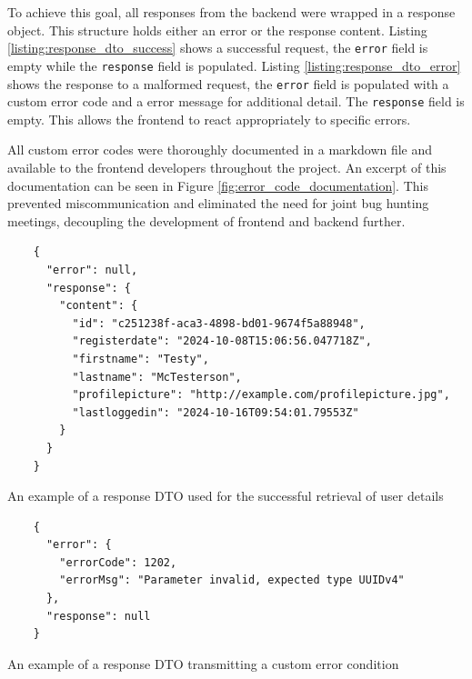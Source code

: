 To achieve this goal, all responses from the backend were wrapped in a response
object. This structure holds either an error or the response content. Listing
\ref{listing:response_dto_success} shows a successful request, the
\texttt{error} field is empty while the \texttt{response} field is populated.
Listing \ref{listing:response_dto_error} shows the response to a malformed
request, the \texttt{error} field is populated with a custom error code and a
error message for additional detail. The \texttt{response} field is empty. This
allows the frontend to react appropriately to specific errors.

All custom error codes were thoroughly documented in a markdown file and
available to the frontend developers throughout the project. An excerpt of this
documentation can be seen in Figure \ref{fig:error_code_documentation}. This
prevented miscommunication and eliminated the need for joint bug hunting
meetings, decoupling the development of frontend and backend further.

\begin{listing}[htbp]
  \centering{}
  \begin{minipage}{0.775\textwidth}
  \begin{verbatim}
    {
      "error": null,
      "response": {
        "content": {
          "id": "c251238f-aca3-4898-bd01-9674f5a88948",
          "registerdate": "2024-10-08T15:06:56.047718Z",
          "firstname": "Testy",
          "lastname": "McTesterson",
          "profilepicture": "http://example.com/profilepicture.jpg",
          "lastloggedin": "2024-10-16T09:54:01.79553Z"
        }
      }
    }
  \end{verbatim}
  \end{minipage}
  \caption{An example of a response DTO used for the successful retrieval of user details}
  \label{listing:response_dto_success}
\end{listing}

\begin{listing}[htbp]
  \centering{}
  \begin{minipage}{0.7\textwidth}
  \begin{verbatim}
    {
      "error": {
        "errorCode": 1202,
        "errorMsg": "Parameter invalid, expected type UUIDv4"
      },
      "response": null
    }
  \end{verbatim}
  \end{minipage}
  \caption{An example of a response DTO transmitting a custom error condition}
  \label{listing:response_dto_error}
\end{listing}

